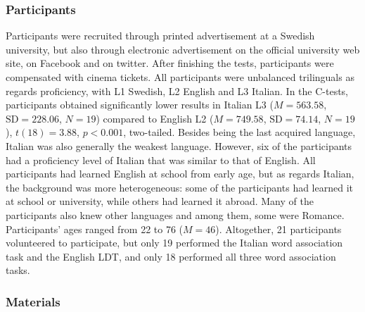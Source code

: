 \documentclass[output=paper,colorlinks,citecolor=brown,nonflat]{langsci/langscibook}
\begin{document}
\subsubsection{Participants}\label{sec:gudmundson:2.2.2}

Participants were recruited through printed advertisement at a Swedish university, but also through electronic advertisement on the official university web site, on Facebook and on twitter. After finishing the tests, participants were compensated with cinema tickets. All participants were unbalanced trilinguals as regards proficiency, with L1 Swedish, L2 English and L3 Italian. In the C-tests, participants obtained significantly lower results in Italian L3 ($M = 563.58$, $\text{SD} = 228.06$, $N = 19$) compared to English L2 ($M = 749.58$, $\text{SD} = 74.14$, $N = 19$), $t(18) = 3.88$, $p < 0.001$, two-tailed. Besides being the last acquired language, Italian was also generally the weakest language. However, six of the participants had a proficiency level of Italian that was similar to that of English. All participants had learned English at school from early age, but as regards Italian, the background was more heterogeneous: some of the participants had learned it at school or university, while others had learned it abroad. Many of the participants also knew other languages and among them, some were Romance. Participants’ ages ranged from 22 to 76 ($M = 46$). Altogether, 21 participants volunteered to participate, but only 19 performed the Italian word association task and the English LDT, and only 18 performed all three word association tasks.

\subsubsection{Materials}\label{sec:gudmundson:2.2.3}
\end{document}
